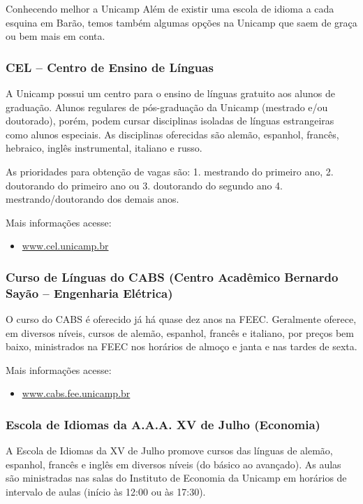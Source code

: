 \begin{story}{Conhecendo melhor a Unicamp}
Além de existir uma escola de idioma a cada esquina em Barão, temos também algumas opções na Unicamp que saem de graça ou bem mais em conta.

\subsubsection*{CEL -- Centro de Ensino de Línguas}

A Unicamp possui um centro para o ensino de línguas gratuito aos alunos de graduação. Alunos regulares de pós-graduação da Unicamp (mestrado e/ou doutorado), porém, podem cursar disciplinas isoladas de línguas estrangeiras como alunos especiais. As disciplinas oferecidas são alemão, espanhol, francês, hebraico, inglês instrumental, italiano e russo.

As prioridades para obtenção de vagas são: 1. mestrando do primeiro ano, 2. doutorando do primeiro ano ou 3. doutorando do segundo ano 4. mestrando/doutorando dos demais anos.

Mais informações acesse:

\begin{itemize}
\item \url{www.cel.unicamp.br}
\end{itemize}

\subsubsection*{Curso de Línguas do CABS (Centro Acadêmico Bernardo Sayão -- Engenharia Elétrica)}

O curso do CABS é oferecido já há quase dez anos na FEEC. Geralmente oferece, em diversos níveis, cursos de alemão, espanhol, francês e italiano, por preços bem baixo, ministrados na FEEC nos horários de almoço e janta e nas tardes de sexta.

Mais informações acesse:

\begin{itemize}
\item \url{www.cabs.fee.unicamp.br}
\end{itemize}

\subsubsection*{Escola de Idiomas da A.A.A. XV de Julho (Economia)}

A Escola de Idiomas da XV de Julho promove cursos das línguas de alemão, espanhol, francês e inglês em diversos níveis (do básico ao avançado). As aulas são ministradas nas salas do Instituto de Economia da Unicamp em horários de intervalo de aulas (início às 12:00 ou às 17:30).


\end{story}
